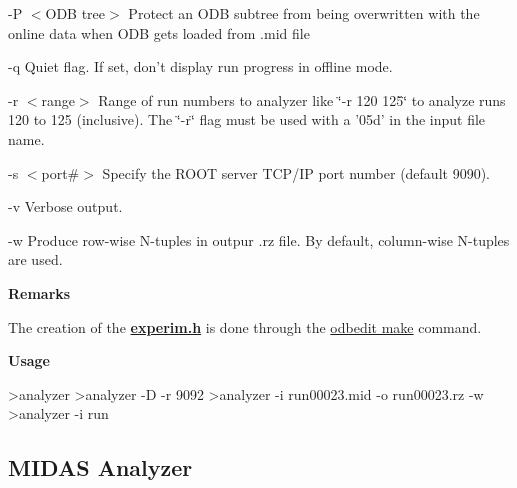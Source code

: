 \begin{DoxyItemize}
\begin{DoxyItemize}
\item -\/P $<$ODB tree$>$ Protect an ODB subtree from being overwritten with the online data when ODB gets loaded from .mid file
\item -\/q Quiet flag. If set, don't display run progress in offline mode.
\item -\/r $<$range$>$ Range of run numbers to analyzer like \char`\"{}-\/r 120 125\char`\"{} to analyze runs 120 to 125 (inclusive). The \char`\"{}-\/r\char`\"{} flag must be used with a '05d' in the input file name.
\item -\/s $<$port\#$>$ Specify the ROOT server TCP/IP port number (default 9090).
\item -\/v Verbose output.
\item -\/w Produce row-\/wise N-\/tuples in outpur .rz file. By default, column-\/wise N-\/tuples are used.
\end{DoxyItemize}
\item {\bfseries  Remarks }
\begin{DoxyItemize}
\item The creation of the {\bfseries \hyperlink{experim_8h}{experim.h}} is done through the \hyperlink{RC_odbedit_examples_RC_odbedit_make}{odbedit make} command.
\end{DoxyItemize}
\end{DoxyItemize}


\begin{DoxyItemize}
\item {\bfseries  Usage } 
\begin{DoxyCode}
  >analyzer
  >analyzer -D -r 9092
  >analyzer -i run00023.mid -o run00023.rz -w
  >analyzer -i run%
\end{DoxyCode}

\end{DoxyItemize}

\par


\par
 \label{DataAnalysis_idx_analyzer_HBOOK}
\hypertarget{DataAnalysis_idx_analyzer_HBOOK}{}
 \label{DataAnalysis_idx_analyzer_PAW}
\hypertarget{DataAnalysis_idx_analyzer_PAW}{}
 \label{DataAnalysis_idx_analyzer_ROOT}
\hypertarget{DataAnalysis_idx_analyzer_ROOT}{}
 \label{DataAnalysis_idx_analyzer_MIDAS}
\hypertarget{DataAnalysis_idx_analyzer_MIDAS}{}
 \label{DataAnalysis_idx_analyzer_demo}
\hypertarget{DataAnalysis_idx_analyzer_demo}{}
 \hypertarget{DataAnalysis_DA_Midas_Analyzer}{}\subsection{MIDAS Analyzer}\label{DataAnalysis_DA_Midas_Analyzer}

